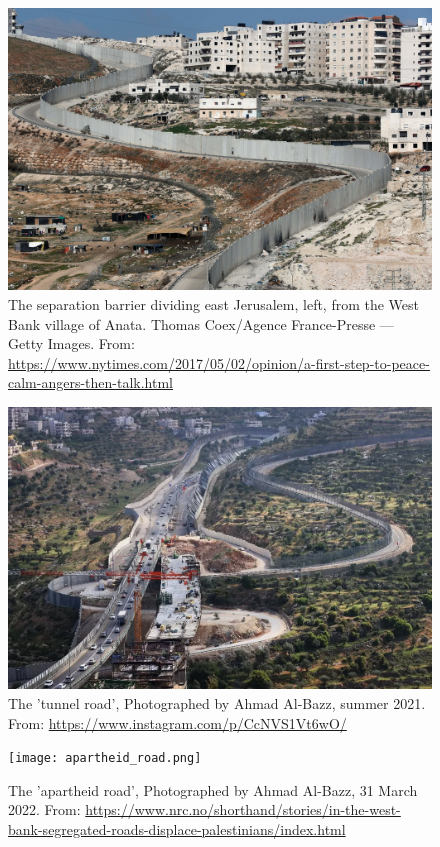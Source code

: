 \documentclass[dissertation,math,vertlayout,pdfa,colorlinks,nologo]{aaltoseries}
\begin{document}
\begin{figure}
    \centering
    \includegraphics[width=1\linewidth]{separation-barrier-nyimes.jpg}
    \caption{The separation barrier dividing east Jerusalem, left, from the West Bank village of Anata. Thomas Coex/Agence France-Presse — Getty Images. From: \url{https://www.nytimes.com/2017/05/02/opinion/a-first-step-to-peace-calm-angers-then-talk.html}}
    \label{fig:separation-barrier}
\end{figure}

\begin{figure}
    \centering
    \includegraphics[width=1\linewidth]{gilo_bridge.jpg}
    \caption{The 'tunnel road', Photographed by Ahmad Al-Bazz, summer 2021. From: \url{https://www.instagram.com/p/CcNVS1Vt6wO/}}
    \label{fig:tunnel_road}
\end{figure}

\begin{figure}
    \centering
    \texttt{[image: apartheid\_road.png]}
    \caption{The 'apartheid road', Photographed by Ahmad Al-Bazz, 31 March 2022. From: \url{https://www.nrc.no/shorthand/stories/in-the-west-bank-segregated-roads-displace-palestinians/index.html}}
    \label{fig:apartheid-road}
\end{figure}
\end{document}
